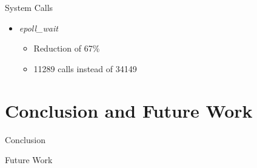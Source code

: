 \documentclass[shortpres,aspectratio=43]{beamer}
\newlength{\mylength}
\begin{document}
\begin{frame}{System Calls}
\begin{minipage}{0.51\textwidth}
\begin{itemize}
            \item \textit{epoll\_wait}
            \vspace{2\mylength}
            \begin{itemize}
                \item Reduction of 67\%
                \vspace{2\mylength}
                \item 11289 calls instead of 34149
            \end{itemize}
            \vspace{2\mylength}
        \end{itemize}
    \end{minipage}
\end{frame}


\section{Conclusion and Future Work}

\begin{frame}{}
  \tableofcontents[currentsection]
\end{frame}

\begin{frame}{Conclusion}
\end{frame}

\begin{frame}{Future Work}
\end{frame}
\end{document}
